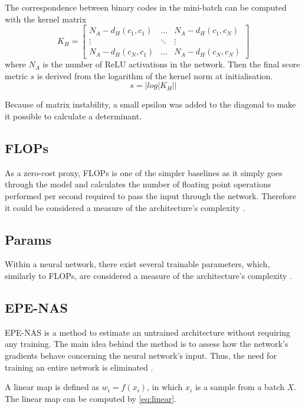 The correspondence between binary codes in the mini-batch can be computed with the kernel matrix
\begin{equation} 
K_H = \begin{bmatrix} 
        N_A-d_H(c_1, c_1) & \dots & N_A-d_H(c_1, c_N) \\ 
        \vdots & \ddots & \vdots \\ 
        N_A-d_H(c_N, c_1) & \dots & N_A-d_H(c_N, c_N)
    \end{bmatrix} 
\end{equation}
where $N_A$ is the number of ReLU activations in the network. Then the final score metric $s$ is derived from the logarithm of the kernel norm at initialisation. 
\begin{equation}
s = |log|K_H||
\end{equation}


Because of matrix instability, a small epsilon was added to the diagonal to make it possible to calculate a determinant.

\subsection{FLOPs}

As a zero-cost proxy, \Gls{FLOPs} is one of the simpler baselines as it simply goes through the model and calculates the number of floating point operations performed per second required to pass the input through the network. Therefore it could be considered a measure of the architecture's complexity \autocite{ning2021evaluating}. 

\subsection{Params}
Within a neural network, there exist several trainable parameters, which, similarly to \gls{FLOPs}, are considered a measure of the architecture's complexity \autocite{ning2021evaluating}. 

\subsection{EPE-NAS}
EPE-NAS is a method to estimate an untrained architecture without requiring any training. The main idea behind the method is to assess how the network's gradients behave concerning the neural network's input. Thus, the need for training an entire network is eliminated \autocite{lopes2021epe}. 

A linear map is defined as $w_i = f(x_i)$, in which $x_i$ is a sample from a batch $X$. The linear map can be computed by \cref{eq:linear}. 

